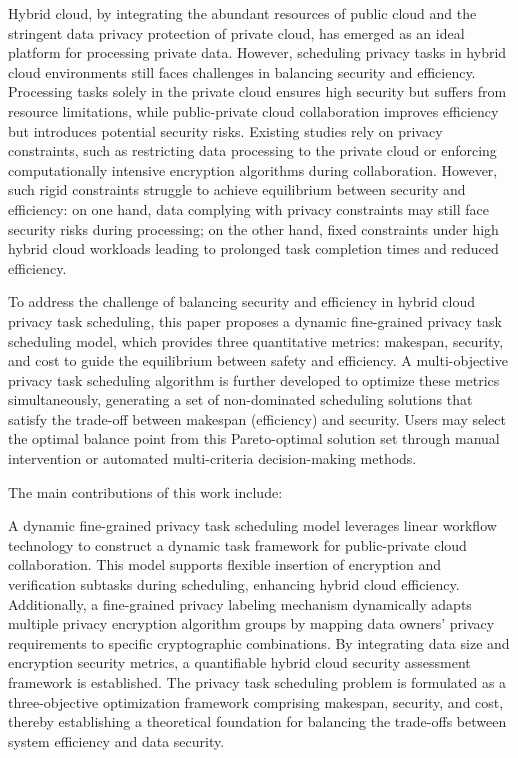 Hybrid cloud, by integrating the abundant resources of public cloud and the stringent data privacy protection of private cloud, has emerged as an ideal platform for processing private data. However, scheduling privacy tasks in hybrid cloud environments still faces challenges in balancing security and efficiency. Processing tasks solely in the private cloud ensures high security but suffers from resource limitations, while public-private cloud collaboration improves efficiency but introduces potential security risks. Existing studies rely on privacy constraints, such as restricting data processing to the private cloud or enforcing computationally intensive encryption algorithms during collaboration. However, such rigid constraints struggle to achieve equilibrium between security and efficiency: on one hand, data complying with privacy constraints may still face security risks during processing; on the other hand, fixed constraints under high hybrid cloud workloads leading to prolonged task completion times and reduced efficiency.

To address the challenge of balancing security and efficiency in hybrid cloud privacy task scheduling, this paper proposes a dynamic fine-grained privacy task scheduling model, which provides three quantitative metrics: makespan, security, and cost to guide the equilibrium between safety and efficiency. A multi-objective privacy task scheduling algorithm is further developed to optimize these metrics simultaneously, generating a set of non-dominated scheduling solutions that satisfy the trade-off between makespan (efficiency) and security. Users may select the optimal balance point from this Pareto-optimal solution set through manual intervention or automated multi-criteria decision-making methods.

The main contributions of this work include:

A dynamic fine-grained privacy task scheduling model leverages linear workflow technology to construct a dynamic task framework for public-private cloud collaboration. This model supports flexible insertion of encryption and verification subtasks during scheduling, enhancing hybrid cloud efficiency. Additionally, a fine-grained privacy labeling mechanism dynamically adapts multiple privacy encryption algorithm groups by mapping data owners’ privacy requirements to specific cryptographic combinations. By integrating data size and encryption security metrics, a quantifiable hybrid cloud security assessment framework is established. The privacy task scheduling problem is formulated as a three-objective optimization framework comprising makespan, security, and cost, thereby establishing a theoretical foundation for balancing the trade-offs between system efficiency and data security.

